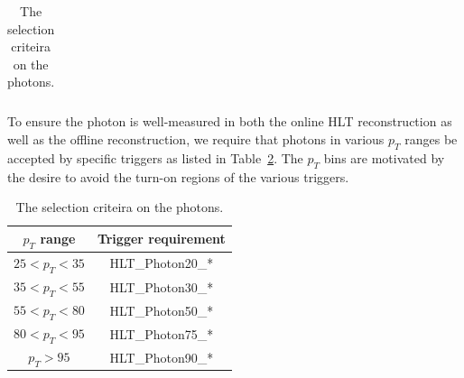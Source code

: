 \begin{table}[!ht]
\begin{center}
\begin{tabular}{|c|c|}

\end{tabular}
\caption{The selection criteira on the photons.
\label{tab:PhotonSelection}}
\end{center}
\end{table}

To ensure the photon is well-measured in both the online HLT reconstruction as well as the offline reconstruction, we require that photons in
various $p_T$ ranges be accepted by specific triggers as listed in Table~\ref{tab:PhotonTriggerPtBins}. The $p_T$ bins are motivated by the
desire to avoid the turn-on regions of the various triggers.
\begin{table}[!ht]
\begin{center}
\begin{tabular}{|c|c|} 
\hline
$p_T$ range     & Trigger requirement \\
\hline
$25 < p_T < 35$ & HLT\_Photon20\_* \\
$35 < p_T < 55$ & HLT\_Photon30\_* \\
$55 < p_T < 80$ & HLT\_Photon50\_* \\
$80 < p_T < 95$ & HLT\_Photon75\_* \\
$p_T > 95$      & HLT\_Photon90\_* \\
\hline
\end{tabular}
\caption{The selection criteira on the photons.
\label{tab:PhotonTriggerPtBins}}
\end{center}
\end{table}

